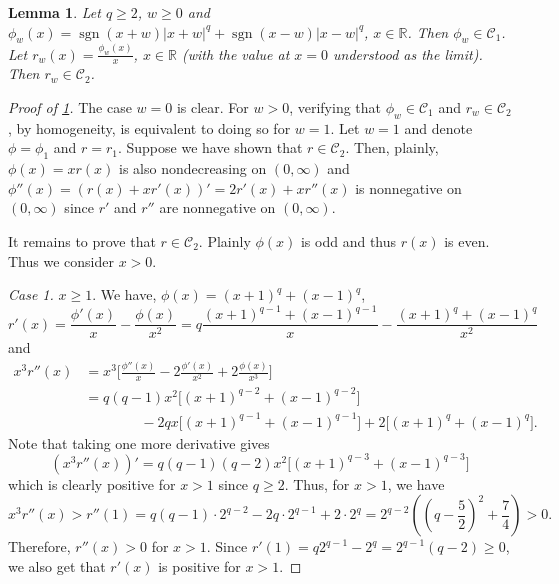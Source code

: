 \documentclass[10pt]{article}
\newcommand{\1}{\textbf{1}}
\newcommand{\R}{\mathbb{R}}
\DeclareMathOperator{\sgn}{sgn}
\newtheorem{lemma}{Lemma}[subsection]
\theoremstyle{remark}
\theoremstyle{definition}
\begin{document}
\begin{lemma}\label{lm:r-is-convex}
Let $q \geq 2$, $w \geq 0$ and $\phi_w(x) = \sgn(x+w)|x+w|^q + \sgn(x-w)|x-w|^q$, $x \in \R$. Then $\phi_w \in \mathcal{C}_1$. Let $r_w(x) = \frac{\phi_w(x)}{x}$, $x \in \R$ (with the value at $x=0$ understood as the limit). Then $r_w \in \mathcal{C}_2$.
\end{lemma}
\begin{proof}[Proof of \ref{lm:r-is-convex}]
The case $w=0$ is clear. For $w > 0$, verifying that $\phi_w \in \mathcal{C}_1$ and $r_w \in \mathcal{C}_2$, by homogeneity, is equivalent to doing so for $w=1$. Let $w=1$ and denote $\phi=\phi_1$ and $r=r_1$. Suppose we have shown that $r \in \mathcal{C}_2$. Then, plainly, $\phi(x) = xr(x)$ is also nondecreasing on $(0,\infty)$ and $\phi''(x) = (r(x) +xr'(x))' = 2r'(x) + xr''(x)$ is nonnegative on $(0,\infty)$ since $r'$ and $r''$ are nonnegative on $(0,\infty)$. 

It remains to prove that $r \in \mathcal{C}_2$. Plainly $\phi(x)$ is odd and thus $r(x)$ is even. Thus we consider $x > 0$.

\bigskip
\noindent
\emph{Case 1.} $x \geq 1$. We have, $\phi(x) = (x+1)^q + (x-1)^q$,
\[
r'(x) = \frac{\phi'(x)}{x} - \frac{\phi(x)}{x^2} = q\frac{(x+1)^{q-1}+(x-1)^{q-1}}{x} - \frac{(x+1)^q+(x-1)^q}{x^2}
\]
and
\begin{align*}
x^3r''(x) &= x^3\Bigg[\frac{\phi''(x)}{x}-2\frac{\phi'(x)}{x^2}+2\frac{\phi(x)}{x^3}\Bigg]\\
&=q(q-1)x^2\Big[(x+1)^{q-2}+(x-1)^{q-2}\Big] \\
&\qquad\qquad-2qx\Big[(x+1)^{q-1}+(x-1)^{q-1}\Big]+ 2\Big[(x+1)^q+(x-1)^q\Big].
\end{align*}
Note that taking one more derivative gives
\[
(x^3r''(x))' = q(q-1)(q-2)x^2\Big[(x+1)^{q-3}+(x-1)^{q-3}\Big]
\]
which is clearly positive for $x > 1$ since $q \geq 2$. Thus, for $x > 1$, we have
\[
x^3r''(x) > r''(1) = q(q-1)\cdot 2^{q-2}-2q\cdot 2^{q-1}+2\cdot 2^{q} = 2^{q-2}\left( \left(q-\frac{5}{2}\right)^2 + \frac{7}{4}\right) > 0.
\]
Therefore, $r''(x) > 0$ for $x > 1$. Since $r'(1) = q2^{q-1}-2^q = 2^{q-1}(q-2) \geq 0$, we also get that $r'(x)$ is positive for $x > 1$.




\end{proof}
\end{document}
